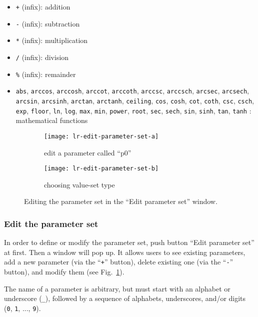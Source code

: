 \documentclass[a4paper,10pt]{report}
\begin{document}
\begin{itemize}
\item \verb|+| (infix): addition
\item \verb|-| (infix): subtraction
\item \verb|*| (infix): multiplication
\item \verb|/| (infix): division
\item \verb|%| (infix): remainder
\item
  \verb|abs|,
  \verb|arccos|,
  \verb|arccosh|,
  \verb|arccot|,
  \verb|arccoth|,
  \verb|arccsc|,
  \verb|arccsch|,
  \verb|arcsec|,
  \verb|arcsech|,
  \verb|arcsin|,
  \verb|arcsinh|,
  \verb|arctan|,
  \verb|arctanh|,
  \verb|ceiling|,
  \verb|cos|,
  \verb|cosh|,
  \verb|cot|,
  \verb|coth|,
  \verb|csc|,
  \verb|csch|,
  \verb|exp|,
  \verb|floor|,
  \verb|ln|,
  \verb|log|,
  \verb|max|,
  \verb|min|,
  \verb|power|,
  \verb|root|,
  \verb|sec|,
  \verb|sech|,
  \verb|sin|,
  \verb|sinh|,
  \verb|tan|,
  \verb|tanh|
  : mathematical functions
\end{itemize}

\begin{figure}[h]
  \centering
  \begin{subfigure}[b]{0.45\textwidth}
    \texttt{[image: lr-edit-parameter-set-a]}
    \caption{edit a parameter called ``p0''}\label{fig:lr-edit-parameter-set-a}
  \end{subfigure}
  \begin{subfigure}[b]{0.45\textwidth}
    \texttt{[image: lr-edit-parameter-set-b]}
    \caption{choosing value-set type}\label{fig:lr-edit-parameter-set-b}
  \end{subfigure}
  \caption{Editing the parameter set in the ``Edit parameter set'' window.}
\end{figure}

\subsubsection{Edit the parameter set}
In order to define or modify the parameter set, push button ``Edit parameter
set'' at first. Then a window will pop up. It allows users to see existing
parameters, add a new parameter (via the ``\verb|+|'' button), delete existing
one (via the ``\verb|-|'' button), and modify them (see
Fig.~\ref{fig:lr-edit-parameter-set-a}).

The name of a parameter is arbitrary, but must start with an alphabet or
underscore (\verb|_|), followed by a sequence of alphabets, underscores, and/or
digits (\verb|0|, \verb|1|, ..., \verb|9|).
\end{document}
